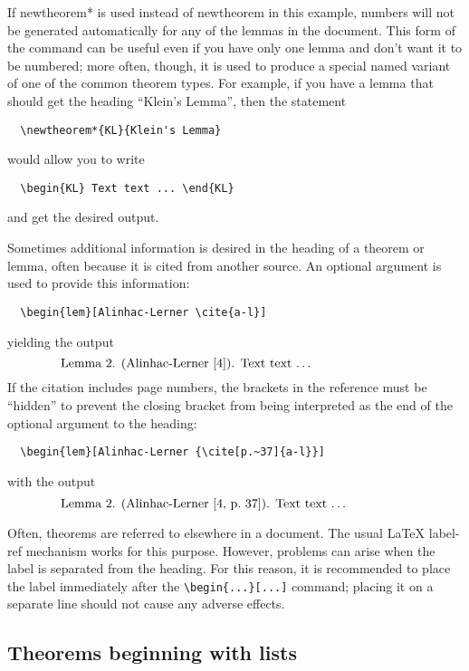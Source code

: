 \documentclass[11pt,twoside]{article}
\providecommand{\qq}[1]{\textquotedblleft#1\textquotedblright}
\newcommand{\ntt}{%
  \fontfamily\ttdefault \fontseries\mddefault \fontshape\updefault
  \selectfont
}
\DeclareRobustCommand{\cn}[1]{{\ntt\bslchar#1}}
\def\latex/{{\protect\LaTeX}}
\begin{document}
If \cn{newtheorem*} is used instead of \cn{newtheorem} in this
example, numbers will not be generated automatically for
any of the lemmas in the document. This form of the command can be
useful even if you have only one lemma and don't want it to be
numbered; more often, though, it is used to produce a special named
variant of one of the common theorem types. For example, if you have a
lemma that should get the heading \qq{Klein's Lemma}, then the statement
\begin{verbatim}
  \newtheorem*{KL}{Klein's Lemma}
\end{verbatim}
would allow you to write
\begin{verbatim}
  \begin{KL} Text text ... \end{KL}
\end{verbatim}
and get the desired output.

Sometimes additional information is desired in the heading of a
theorem or lemma, often because it is cited from another source.
An optional argument is used to provide this information:
\begin{verbatim}
  \begin{lem}[Alinhac-Lerner \cite{a-l}]
\end{verbatim}
yielding the output
\[\makebox[.8\columnwidth]{%
  \textbf{Lemma 2.} (Alinhac-Lerner [4]). \textit{Text text \dots}\hfill}\]
If the citation includes page numbers, the brackets in the reference
must be ``hidden'' to prevent the closing bracket from being interpreted
as the end of the optional argument to the heading:
\begin{verbatim}
  \begin{lem}[Alinhac-Lerner {\cite[p.~37]{a-l}}]
\end{verbatim}
with the output
\[\makebox[.8\columnwidth]{%
  \textbf{Lemma 2.} (Alinhac-Lerner [4, p.~37]). \textit{Text text \dots}\hfill}\]

Often, theorems are referred to elsewhere in a document.  The usual
\latex/ \cn{label}-\cn{ref} mechanism works for this purpose.  However,
problems can arise when the \cn{label} is separated from the heading.
For this reason, it is recommended to place the label immediately
after the \verb+\begin{...}[...]+ command; placing it on a separate line
should not cause any adverse effects.

\subsection{Theorems beginning with lists}
\label{ThmWithList}
\end{document}
